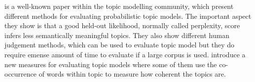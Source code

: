 \citet{tea_leaves} is a well-known paper within the topic modelling community, which present different methods for evaluating probabilistic topic models. 
The important aspect they show is that a good held-out likelihood, normally called perplexity, score infers less semantically meaningful topics.
They also show different human judgement methods, which can be used to evaluate topic model but they do require emense amount of time to evaluate if a large corpus is used.
\citet{topic_coherence_2015} introduce a new measures for evaluating topic models where some of them use the co-occurrence of words within topic to measure how coherent the topics are.  


